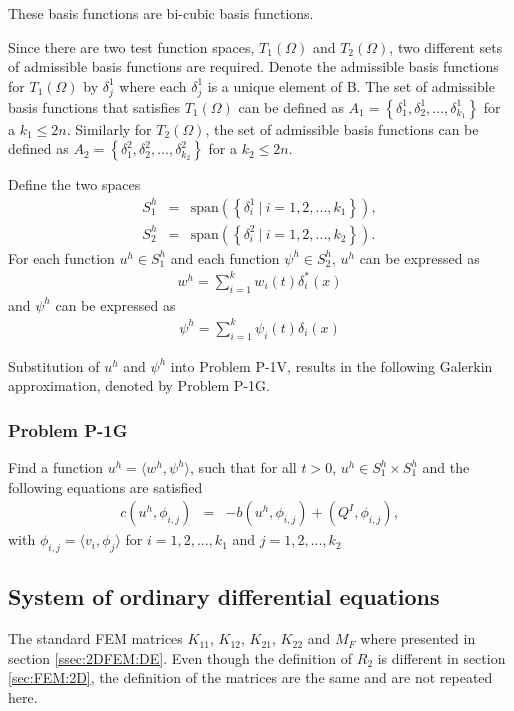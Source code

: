 \documentclass[../../main.tex]{subfiles}
\begin{document}
These basis functions are bi-cubic basis functions.

Since there are two test function spaces, $T_1(\Omega)$ and $T_2(\Omega)$, two different sets of admissible basis functions are required. Denote the admissible basis functions for $T_1(\Omega)$ by $\delta^1_j$ where each $\delta^1_j$ is a unique element of B. The set of admissible basis functions that satisfies $T_1(\Omega)$ can be defined as $A_1 = \left\{\delta^1_1, \delta^1_2,..., \delta^1_{k_1} \right\}$ for a $k_1 \leq 2n$. Similarly for $T_2(\Omega)$, the set of admissible basis functions can be defined as $A_2 = \left\{\delta^2_1, \delta^2_2,..., \delta^2_{k_2} \right\}$ for a $k_2 \leq 2n$.

Define the two spaces
\begin{eqnarray*}
	S^h_1 & = & \textrm{span}\left(\left\{\delta^1_i \ | \ i = 1,2,...,k_1 \right\} \right),\\
	S^h_2 & = & \textrm{span}\left(\left\{\delta^2_i \ | \ i = 1,2,...,k_2 \right\} \right).
\end{eqnarray*}
For each function $u^h \in S_1^h$ and each function $\psi^h \in S_2^h$, $u^h$ can be expressed as
\begin{eqnarray*}
	w^h = \sum_{i = 1}^{k} w_i(t) \delta^*_{i}(x)
\end{eqnarray*} and $\psi^h$ can be expressed as
\begin{eqnarray*}
	\psi^h = \sum_{i = 1}^{k} \psi_i(t) \delta_{i}(x)
\end{eqnarray*}

Substitution of $u^h$ and $\psi^h$ into Problem P-1V, results in the following Galerkin approximation, denoted by Problem P-1G.

\subsubsection{Problem P-1G}
Find a function $u^h = \langle w^h, \psi^h \rangle$, such that for all $t>0$, $u^h \in S_1^h \times S_1^h$ and the following equations are satisfied
\begin{eqnarray}
	c(u^h,\phi_{i,j}) &=& -b(u^h,\phi_{i,j}) + (Q^I,\phi_{i,j}), \label{eq:P_Model:ProblemP1V1}
\end{eqnarray} with $\phi_{i,j} = \langle v_i, \phi_j \rangle$ for $i = 1,2,...,k_1$ and $j = 1,2,...,k_2$

\subsection{System of ordinary differential equations}
The standard FEM matrices $K_{11}$, $K_{12}$, $K_{21}$, $K_{22}$ and $M_F$ where presented in section \ref{ssec:2DFEM:DE}. Even though the definition of $R_2$ is different in section \ref{sec:FEM:2D}, the definition of the matrices are the same and are not repeated here.
\end{document}
